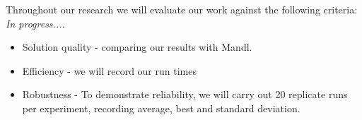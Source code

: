 Throughout our research we will evaluate our work against the following criteria: \textit{In progress....}
\begin{itemize}
\item Solution quality - comparing our results with Mandl.
\item Efficiency - we will record our run times
\item Robustness - To demonstrate reliability, we will carry out 20 replicate runs per experiment, recording average, best and standard deviation. 
\end{itemize}




